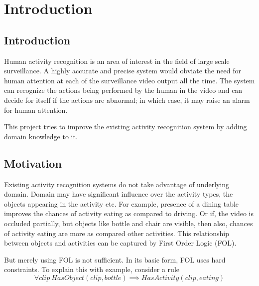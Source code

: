 \chapter{Introduction}

\label{ch1_INTRO}


\section{Introduction}
Human activity recognition is an area of interest in the field of large scale surveillance.
A highly accurate and precise system would obviate the need for human attention
at each of the surveillance video output all the time. The system can recognize the
actions being performed by the human in the video and can decide for itself if the actions are abnormal;
in which case, it may raise an alarm for human attention.

This project tries to improve the existing activity recognition system
by adding domain knowledge to it.

\begin{comment}
\begin{figure}[here]
\begin{center}	
\texttt{[image: pent]} 
\caption{Pentagon $pqrst$}
\label{fig:pent}
\end{center}
\end{figure}
\end{comment}

\section{Motivation}
Existing activity recognition systems do not take advantage of underlying domain.
Domain may have significant influence over the activity types, the objects appearing
in the activity etc. For example, presence of a dining table improves the chances
of activity eating as compared to driving. Or if, the video is occluded partially,
but objects like bottle and chair are visible, then also, chances of activity eating
are more as compared other activities. This relationship between objects and activities
can be captured by First Order Logic (FOL).

But merely using FOL is not sufficient. In its basic form, FOL uses hard constraints.
To explain this with example, consider a rule
\begin{equation}
	\label{MLNRule}
	\forall clip ~ HasObject( clip, bottle ) \implies HasActivity( clip, eating )
\end{equation}

